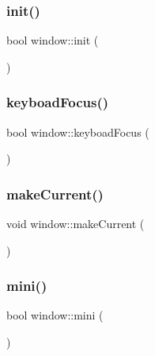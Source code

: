 \subsubsection{\texorpdfstring{init()}{init()}}
{\footnotesize\ttfamily bool window\+::init (\begin{DoxyParamCaption}{ }\end{DoxyParamCaption})}

\mbox{\label{classwindow_af1fea6fcd133b4dc5a9f8ce5badfa3c5}} 
\subsubsection{\texorpdfstring{keyboad\+Focus()}{keyboadFocus()}}
{\footnotesize\ttfamily bool window\+::keyboad\+Focus (\begin{DoxyParamCaption}{ }\end{DoxyParamCaption})}

\mbox{\label{classwindow_a0b20618eaa80cec156c41e65e5d92817}} 
\subsubsection{\texorpdfstring{make\+Current()}{makeCurrent()}}
{\footnotesize\ttfamily void window\+::make\+Current (\begin{DoxyParamCaption}{ }\end{DoxyParamCaption})}

\mbox{\label{classwindow_aaedffb8fcfdda61beda75a2f31651948}} 
\subsubsection{\texorpdfstring{mini()}{mini()}}
{\footnotesize\ttfamily bool window\+::mini (\begin{DoxyParamCaption}{ }\end{DoxyParamCaption})}

\mbox{\label{classwindow_a075faf88a621288e18a9c112628be059}} 
